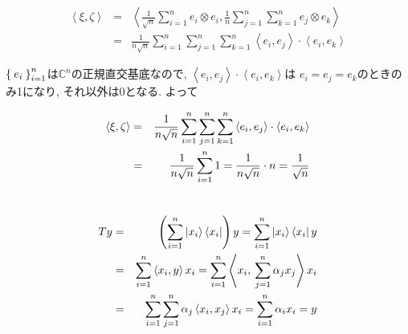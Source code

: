 \documentclass[a4paper,11pt]{jsarticle}
\begin{document}
\section{}
\begin{eqnarray*}
  \left<\xi, \zeta\right> &=& \left<
    \frac{1}{\sqrt{n}}\sum_{i=1}^{n}e_i \otimes e_i,
    \frac{1}{n}\sum_{j=1}^{n}\sum_{k=1}^{n}e_j \otimes e_k
  \right> \\
  &=& \frac{1}{n\sqrt{n}}\sum_{i=1}^n\sum_{j=1}^n\sum_{k=1}^n
  \left<e_i, e_j\right> \cdot \left<e_i, e_k\right>
\end{eqnarray*}

$\Set{e_i}_{i=1}^n$は$\mathbb{C}^n$の正規直交基底なので, 
$\left<e_i, e_j\right> \cdot \left<e_i, e_k\right>$は
$e_i = e_j = e_k$のときのみ1になり, それ以外は0となる.
よって

\begin{eqnarray*}
  \braket{\xi, \zeta}
  &=& \frac{1}{n\sqrt{n}}\sum_{i=1}^n\sum_{j=1}^n\sum_{k=1}^n
    \left<e_i, e_j\right> \cdot \left<e_i, e_k\right> \\
  &=& \frac{1}{n\sqrt{n}}\sum_{i=1}^{n}{1}
    = \frac{1}{n\sqrt{n}} \cdot n = \frac{1}{\sqrt{n}}
\end{eqnarray*}

\section{}
\begin{eqnarray*}
  Ty &=& \left(\sum_{i=1}^n\Ket{x_i}\Bra{x_i}\right)y
    = \sum_{i=1}^n\Ket{x_i}\Bra{x_i}y \\
  &=& \sum_{i=1}^n\braket{x_i, y}x_i
    = \sum_{i=1}^n\Braket{x_i, \hspace{2pt}\sum_{j=1}^n\alpha_j x_j}x_i \\
  &=& \sum_{i=1}^n\sum_{j=1}^n\alpha_j\Braket{x_i, x_j}x_i
    = \sum_{i=1}^n\alpha_ix_i = y
\end{eqnarray*}
\end{document}
